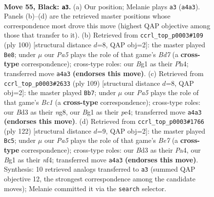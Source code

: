 \documentclass[11pt]{article}
\begin{document}
\clearpage

\begin{figure}[p]\centering
\begin{subfigure}{0.46\textwidth}\centering
\resizebox{\linewidth}{!}{%
\newchessgame
\chessboard[
  setfen={6K1/8/6p1/6k1/p7/3b4/8/6b1 b - - 1 55},
  showmover=false,
  pgfstyle=straightmove, color=movearrow, markmove={a4-a3}
]}
\caption{}
\end{subfigure}\hfill
\begin{subfigure}{0.46\textwidth}\centering
\resizebox{\linewidth}{!}{%
\newchessgame
\chessboard[
  setfen={8/3B4/5k2/8/7P/5K2/5P1b/8 w - - 13 51},
  showmover=false,
  pgfstyle=straightmove, color=movearrow, markmove={d7-e8}
]}
\caption{}
\end{subfigure}
\\[4pt]
\begin{subfigure}{0.46\textwidth}\centering
\resizebox{\linewidth}{!}{%
\newchessgame
\chessboard[
  setfen={2b3N1/8/8/7p/4P2k/8/5K2/8 b - - 7 55},
  showmover=false,
  pgfstyle=straightmove, color=movearrow, markmove={c8-b7}
]}
\caption{}
\end{subfigure}\hfill
\begin{subfigure}{0.46\textwidth}\centering
\resizebox{\linewidth}{!}{%
\newchessgame
\chessboard[
  setfen={8/4B3/2k5/8/P1K2n2/2P5/8/8 w - - 5 62},
  showmover=false,
  pgfstyle=straightmove, color=movearrow, markmove={e7-c5}
]}
\caption{}
\end{subfigure}
\caption{\textbf{Move 55, Black: \texttt{a3}.} (a) Our position; Melanie plays \texttt{a3} (\texttt{a4a3}). Panels (b)--(d) are the retrieved master positions whose correspondence most drove this move (highest QAP objective among those that transfer to it). (b) Retrieved from \texttt{ccrl\_top\_p0003\#109} (ply 100) [structural distance $d$=8, QAP obj=2]: the master played \texttt{Be8}; under $\mu$ our \emph{Pa5} plays the role of that game's \emph{Bd7} (a \textbf{cross-type} correspondence); cross-type roles: our \emph{B}g1 as their \emph{P}h4; transferred move \texttt{a4a3} \textbf{(endorses this move)}. (c) Retrieved from \texttt{ccrl\_top\_p0003\#2633} (ply 109) [structural distance $d$=8, QAP obj=2]: the master played \texttt{Bb7}; under $\mu$ our \emph{Pa5} plays the role of that game's \emph{Bc1} (a \textbf{cross-type} correspondence); cross-type roles: our \emph{B}d3 as their \emph{n}g8, our \emph{B}g1 as their \emph{p}e4; transferred move \texttt{a4a3} \textbf{(endorses this move)}. (d) Retrieved from \texttt{ccrl\_top\_p0003\#1766} (ply 122) [structural distance $d$=9, QAP obj=2]: the master played \texttt{Bc5}; under $\mu$ our \emph{Pa5} plays the role of that game's \emph{Be7} (a \textbf{cross-type} correspondence); cross-type roles: our \emph{B}d3 as their \emph{P}a4, our \emph{B}g1 as their \emph{n}f4; transferred move \texttt{a4a3} \textbf{(endorses this move)}. Synthesis: 10 retrieved analogs transferred to \texttt{a3} (summed QAP objective 12, the strongest correspondence among the candidate moves); Melanie committed it via the \texttt{search} selector.}
\label{fig:thought-m109}
\end{figure}
\end{document}
